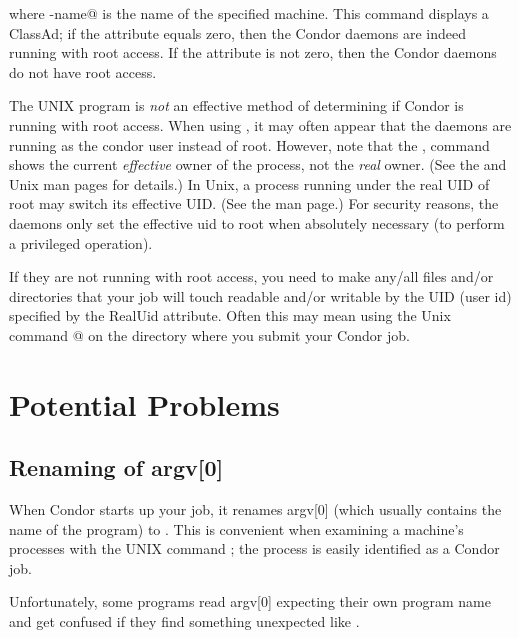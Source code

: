 where \verb@machine-name@ is the name of the specified machine.
This command displays a  ClassAd; if the
attribute  equals zero,
then the Condor daemons are indeed
running with root access.  If the
 attribute is not zero, then the Condor daemons do not have
root access.

\Note The UNIX program 
is \emph{not} an effective
method of determining if Condor is running with root access.
When using ,
it may often appear that the daemons are
running as the condor user instead of root.
However, note that the ,
command shows the current \emph{effective} owner of the
process, not the \emph{real} owner.  (See the  and
 Unix man pages for details.)  In Unix, a process
running under the real UID of root may switch its effective UID.
(See the  man page.)
For security reasons, the daemons
only set the effective uid to root when absolutely necessary
(to perform a privileged operation).

If they are not running with root access, you need to make any/all files
and/or directories that your job will touch readable and/or writable by
the UID (user id) specified by the RealUid attribute.
Often this may
mean using the Unix command @
on the directory where you submit your Condor job.

\section{Potential Problems}

\subsection{Renaming of argv[0]}

When Condor starts up your job, it renames argv[0] (which usually
contains the name of the program) to .
This is
convenient when examining a machine's processes with the UNIX
command ; the process
is easily identified as a Condor job.  

Unfortunately, some programs read argv[0] expecting their own program
name and get confused if they find something unexpected like
.

